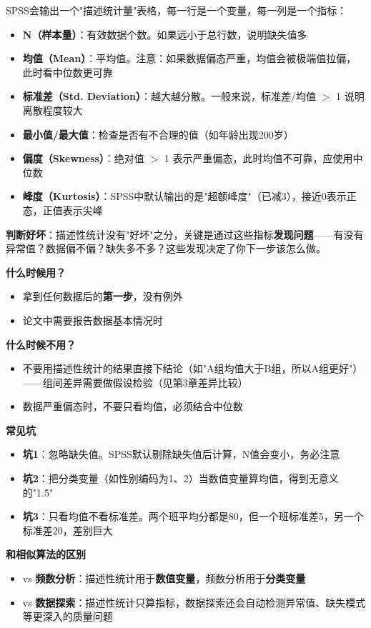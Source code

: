 \begin{algoresult}
SPSS会输出一个"描述统计量"表格，每一行是一个变量，每一列是一个指标：

\begin{itemize}
    \item \textbf{N（样本量）}：有效数据个数。如果远小于总行数，说明缺失值多
    \item \textbf{均值（Mean）}：平均值。注意：如果数据偏态严重，均值会被极端值拉偏，此时看中位数更可靠
    \item \textbf{标准差（Std. Deviation）}：越大越分散。一般来说，标准差/均值 $>$ 1 说明离散程度较大
    \item \textbf{最小值/最大值}：检查是否有不合理的值（如年龄出现200岁）
    \item \textbf{偏度（Skewness）}：绝对值 $>$ 1 表示严重偏态，此时均值不可靠，应使用中位数
    \item \textbf{峰度（Kurtosis）}：SPSS中默认输出的是"超额峰度"（已减3），接近0表示正态，正值表示尖峰
\end{itemize}

\textbf{判断好坏}：描述性统计没有"好坏"之分，关键是通过这些指标\textbf{发现问题}——有没有异常值？数据偏不偏？缺失多不多？这些发现决定了你下一步该怎么做。
\end{algoresult}

\begin{algonotes}
\textbf{什么时候用？}
\begin{itemize}
    \item 拿到任何数据后的\textbf{第一步}，没有例外
    \item 论文中需要报告数据基本情况时
\end{itemize}

\textbf{什么时候不用？}
\begin{itemize}
    \item 不要用描述性统计的结果直接下结论（如"A组均值大于B组，所以A组更好"）——组间差异需要做假设检验（见第3章差异比较）
    \item 数据严重偏态时，不要只看均值，必须结合中位数
\end{itemize}

\textbf{常见坑}
\begin{itemize}
    \item \textbf{坑1}：忽略缺失值。SPSS默认剔除缺失值后计算，N值会变小，务必注意
    \item \textbf{坑2}：把分类变量（如性别编码为1、2）当数值变量算均值，得到无意义的"1.5"
    \item \textbf{坑3}：只看均值不看标准差。两个班平均分都是80，但一个班标准差5，另一个标准差20，差别巨大
\end{itemize}

\textbf{和相似算法的区别}
\begin{itemize}
    \item vs \textbf{频数分析}：描述性统计用于\textbf{数值变量}，频数分析用于\textbf{分类变量}
    \item vs \textbf{数据探索}：描述性统计只算指标，数据探索还会自动检测异常值、缺失模式等更深入的质量问题
\end{itemize}
\end{algonotes}

